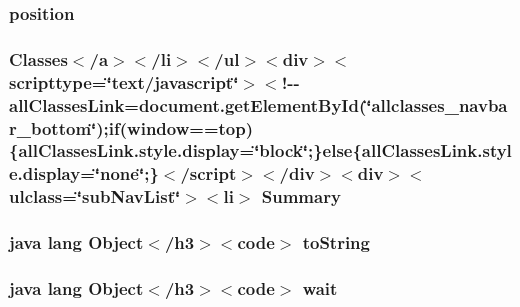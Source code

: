 \hypertarget{_show_all_list_adapter_8html_a7130b1618285588513fd1ff97884b9d9}{
\subsubsection[{position}]{\setlength{\rightskip}{0pt plus 5cm}position}}\label{_show_all_list_adapter_8html_a7130b1618285588513fd1ff97884b9d9}
\hypertarget{_show_all_list_adapter_8html_a6f9ab45abc9b0679dc1b132fbacfc681}{
\subsubsection[{Summary}]{\setlength{\rightskip}{0pt plus 5cm}Classes$<$/{\bf a}$>$$<$/li$>$$<$/ul$>$$<$div$>$$<$scripttype=\char`\"{}text/javascript\char`\"{}$>$$<$!-\/-\/all\-Classes\-Link=document.\-get\-Element\-By\-Id(\char`\"{}allclasses\-\_\-navbar\-\_\-bottom\char`\"{});if(window==top)\{all\-Classes\-Link.\-style.\-display=\char`\"{}block\char`\"{};\}else\{all\-Classes\-Link.\-style.\-display=\char`\"{}none\char`\"{};\}$<$/script$>$$<$/div$>$$<$div$>$$<$ulclass=\char`\"{}sub\-Nav\-List\char`\"{}$>$$<$li$>$ Summary}}\label{_show_all_list_adapter_8html_a6f9ab45abc9b0679dc1b132fbacfc681}
\hypertarget{_show_all_list_adapter_8html_a36e8a76a4132c9a7081416f27d087615}{
\subsubsection[{to\-String}]{\setlength{\rightskip}{0pt plus 5cm}java lang Object$<$/h3$>$$<$code$>$ to\-String}}\label{_show_all_list_adapter_8html_a36e8a76a4132c9a7081416f27d087615}
\hypertarget{_show_all_list_adapter_8html_a9a9f0c22e5688d478c707f910f1c1aea}{
\subsubsection[{wait}]{\setlength{\rightskip}{0pt plus 5cm}java lang Object$<$/h3$>$$<$code$>$ wait}}\label{_show_all_list_adapter_8html_a9a9f0c22e5688d478c707f910f1c1aea}
